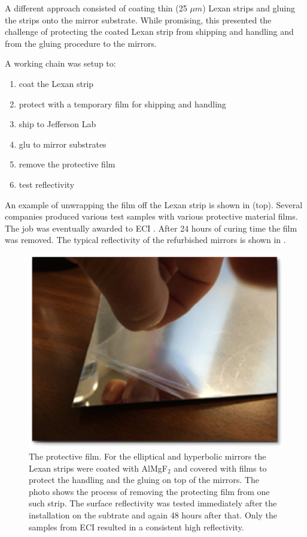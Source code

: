 A different approach consisted of coating thin (25 $\mu m$) Lexan strips and gluing the strips onto the mirror substrate. While promising, this
presented the challenge of protecting the coated Lexan strip from shipping and handling and from the gluing procedure to the mirrors.

A working chain was setup to:

\begin{enumerate}
	\item coat the Lexan strip
	\item protect with a temporary film for shipping and handling
	\item ship to Jefferson Lab
	\item glu to mirror substrates
	\item remove the protective film
	\item test reflectivity
\end{enumerate}

An example of unwrapping the film off the Lexan strip is shown in  (top). Several companies produced various test samples with
various protective material films. The job was eventually awarded to ECI \cite{ECI}.
After 24 hours of curing time the film was removed.
The typical reflectivity of the refurbished mirrors is shown in .


\begin{figure}[t]
\centering
	\includegraphics[width=0.98\columnwidth,keepaspectratio]{img/filmOnStrip.png}
	\caption{The protective film. For the elliptical and hyperbolic mirrors the Lexan strips were coated with AlMgF$_2$
				and covered with films to protect the handling and the
				gluing on top of the mirrors. The photo shows the process of removing the
            protecting film from one such strip. The surface reflectivity was tested immediately after the installation on the subtrate and again
            48 hours after that. Only the samples from ECI \cite{ECI} resulted in a consistent high reflectivity. }
	\label{fig:filmOnStrip}
\end{figure}


